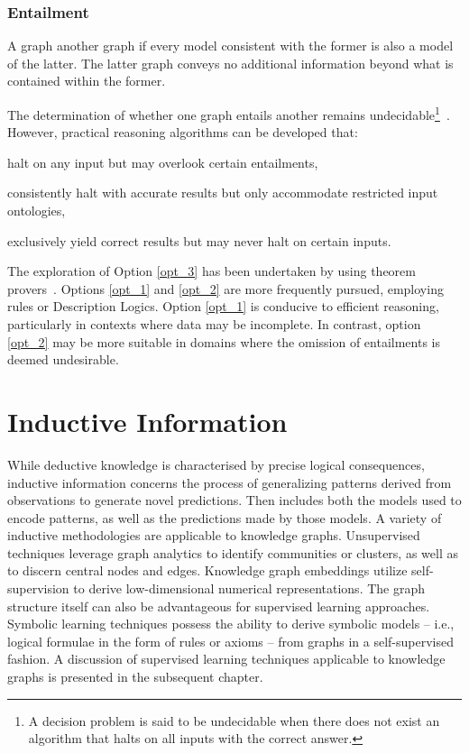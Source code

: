 \subsubsection{Entailment}
A graph  another graph if every model consistent with the former is also a model of the latter. The latter graph conveys no additional information beyond what is contained within the former.

The determination of whether one graph entails another remains undecidable\footnote{A decision problem is said to be undecidable when there does not exist an algorithm that halts on all inputs with the correct answer.}~\cite{Hitzler2010FoundationsSWTechnologies}. However, practical reasoning algorithms can be developed that:
\begin{enumerate*}[label=(\roman*),before=\unskip{ i.e., }, itemjoin={{, }}, itemjoin*={{, or }}]
    \item\label{opt_1} halt on any input but may overlook certain entailments,
    \item\label{opt_2} consistently halt with accurate results but only accommodate restricted input ontologies,
    \item\label{opt_3} exclusively yield correct results but may never halt on certain inputs.
\end{enumerate*}

The exploration of Option \ref{opt_3} has been undertaken by using theorem provers~\cite{Schneider2011ReasoningOWL2Full}. Options \ref{opt_1} and \ref{opt_2} are more frequently pursued, employing rules or Description Logics. Option \ref{opt_1} is conducive to efficient reasoning, particularly in contexts where data may be incomplete. In contrast, option \ref{opt_2} may be more suitable in domains where the omission of entailments is deemed undesirable.

\section{Inductive Information}\label{inductive-information}
While deductive knowledge is characterised by precise logical consequences, inductive information concerns the process of generalizing patterns derived from observations to generate novel predictions. Then  includes both the models used to encode patterns, as well as the predictions made by those models.
A variety of inductive methodologies are applicable to knowledge graphs. Unsupervised techniques leverage graph analytics to identify communities or clusters, as well as to discern central nodes and edges. Knowledge graph embeddings utilize self-supervision to derive low-dimensional numerical representations. The graph structure itself can also be advantageous for supervised learning approaches. Symbolic learning techniques possess the ability to derive symbolic models – i.e., logical formulae in the form of rules or axioms – from graphs in a self-supervised fashion. A discussion of supervised learning techniques applicable to knowledge graphs is presented in the subsequent chapter.


